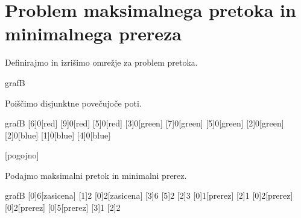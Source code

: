 \documentclass{article}
\begin{document}
\clearpage

\section{Problem maksimalnega pretoka in minimalnega prereza}

Definirajmo in izrišimo omrežje za problem pretoka.


\begin{pretok}{grafB}
\end{pretok}

\noindent
Poiščimo disjunktne povečujoče poti.

\begin{pretok}{grafB}
    \nicle
    [6]{0}[red]
    [9]{0}[red]
    [5]{0}[red]
    [3]{0}[green]
    [7]{0}[green]
    [5]{0}[green]
    [2]{0}[green]
    [2]{0}[blue]
    [1]{0}[blue]
    [4]{0}[blue]

    [pogojno]
\end{pretok}

\noindent
Podajmo maksimalni pretok in minimalni prerez.

\begin{pretok}{grafB}
    \nicle
    [0]{6}[zasicena]
    [1]{2}
    [0]{2}[zasicena]
    [3]{6}
    [5]{2}
    [2]{3}
    [0]{1}[prerez]
    [2]{1}
    [0]{2}[prerez]
    [0]{2}[prerez]
    [0]{5}[prerez]
    [3]{1}
    [2]{2}


\end{pretok}
\end{document}
